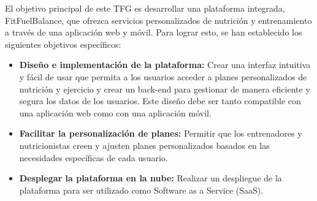 El objetivo principal de este TFG es desarrollar una plataforma integrada, FitFuelBalance, que ofrezca servicios personalizados de nutrición y entrenamiento a través de una aplicación web y móvil. Para lograr esto, se han establecido los siguientes objetivos específicos:

\begin{itemize}
    \item \textbf{Diseño e implementación de la plataforma:} Crear una interfaz intuitiva y fácil de usar que permita a los usuarios acceder a planes personalizados de nutrición y ejercicio y crear un back-end para gestionar de manera eficiente y segura los datos de los usuarios. Este diseño debe ser tanto compatible con una aplicación web como con una aplicación móvil.
    \item \textbf{Facilitar la personalización de planes:} Permitir que los entrenadores y nutricionistas creen y ajusten planes personalizados basados en las necesidades específicas de cada usuario.
    \item \textbf{Desplegar la plataforma en la nube:} Realizar un despliegue de la plataforma para ser utilizado como Software as a Service (SaaS).
\end{itemize}
